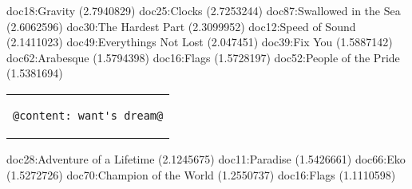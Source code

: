 \documentclass{article}
\begin{document}
doc18:Gravity (2.7940829)
doc25:Clocks (2.7253244)
doc87:Swallowed in the Sea (2.6062596)
doc30:The Hardest Part (2.3099952)
doc12:Speed of Sound (2.1411023)
doc49:Everythings Not Lost (2.047451)
doc39:Fix You (1.5887142)
doc62:Arabesque (1.5794398)
doc16:Flags (1.5728197)
doc52:People of the Pride (1.5381694)

\begin{center}
\begin{tabular}{c}
\begin{lstlisting}[style=prompt]
    @content: want's dream@
\end{lstlisting}
\end{tabular}    
\end{center}

doc28:Adventure of a Lifetime (2.1245675)
doc11:Paradise (1.5426661)
doc66:Eko (1.5272726)
doc70:Champion of the World (1.2550737)
doc16:Flags (1.1110598)
\end{document}
